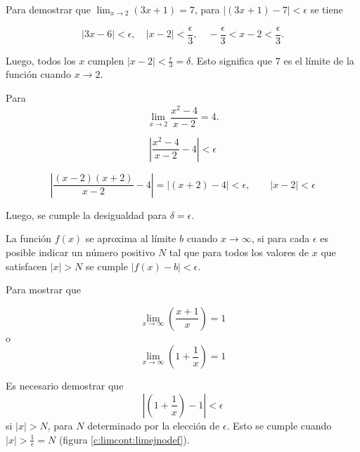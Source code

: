 \begin{example}
  Para demostrar que $\lim_{x \to 2} (3x + 1) = 7$, para $|(3x + 1) - 7| < \epsilon$ se tiene

  $$|3x - 6| < \epsilon, \quad |x - 2| < \frac{\epsilon}{3}, \quad
  -\frac{\epsilon}{3} < x - 2 < \frac{\epsilon}{3}.$$

  Luego, todos los $x$ cumplen $|x - 2| < \frac{\epsilon}{3} = \delta$. Esto significa que $7$ es el límite de la función cuando $x \to 2$.
\end{example}


\begin{example}
  Para $$\lim_{x \to 2} \frac {x^2 - 4} {x - 2} = 4.$$

  $$\left| \frac {x^2 - 4} {x - 2} - 4 \right| < \epsilon$$

  $$\left| \frac {(x - 2) (x + 2)} {x - 2} - 4 \right|
  = |(x + 2) - 4| < \epsilon, \qquad |x - 2| < \epsilon$$

  Luego, se cumple la desigualdad para $\delta = \epsilon$.
\end{example}


\begin{definition}
  La función $f(x)$ se aproxima al límite $b$ cuando $x \to \infty$, si para cada $\epsilon$ es posible indicar un número positivo $N$ tal que para todos los valores de $x$ que satisfacen $|x| > N$ se cumple $|f(x) - b| < \epsilon$.
\end{definition}


\begin{example}
  Para mostrar que

  $$\lim_{x \to \infty} \left( \frac {x + 1} {x} \right) = 1$$
  o
  $$\lim_{x \to \infty} \left( 1 + \frac{1}{x} \right) = 1$$

  Es necesario demostrar que $$\left| \left( 1 + \frac{1}{x} \right) - 1 \right| < \epsilon$$ si $|x| > N$, para $N$ determinado por la elección de $\epsilon$.
  Esto se cumple cuando $|x| > \frac{1}{\epsilon} = N$ (figura \ref{c:limcont:limejnodef}).
\end{example}


